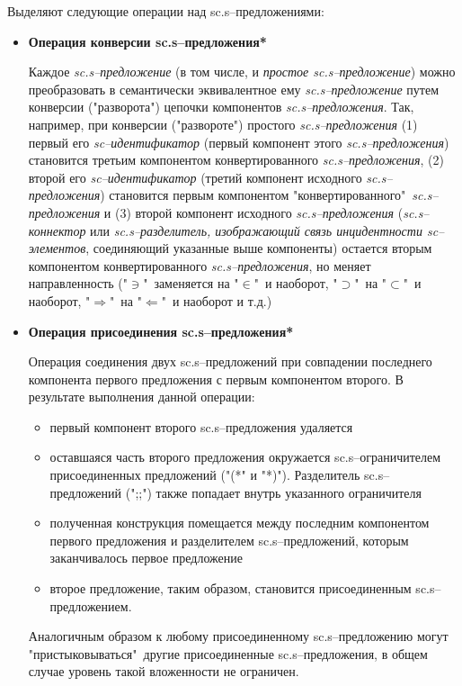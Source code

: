 Выделяют следующие операции над sc.s--предложениями:
\begin{itemize}
	\item{\textbf{Операция конверсии sc.s--предложения*}
		
		Каждое \textit{sc.s--предложение} (в том числе, и \textit{простое sc.s--предложение}) можно преобразовать в семантически эквивалентное ему \textit{sc.s--предложение} путем конверсии ("разворота"{}) цепочки компонентов \textit{sc.s--предложения}. Так, например, при конверсии ("развороте") простого \textit{\mbox{sc.s--предложения}} (1) первый его \textit{\mbox{sc--идентификатор}} (первый компонент этого \textit{\mbox{sc.s--предложения}}) становится третьим компонентом конвертированного\textit{ \mbox{sc.s--предложения}}, (2) второй его \textit{\mbox{sc--идентификатор}} (третий компонент исходного \textit{\mbox{sc.s--предложения}}) становится первым компонентом "конвертированного"\ \textit{\mbox{sc.s--предложения}} и (3) второй компонент исходного \textit{\mbox{sc.s--предложения}} (\textit{\mbox{sc.s--коннектор}} или \textit{\mbox{sc.s--разделитель}, изображающий связь инцидентности \mbox{sc--элементов}}, соединяющий указанные выше компоненты) остается вторым компонентом конвертированного \textit{\mbox{sc.s--предложения}}, но меняет направленность ("$\ni$"\ заменяется на "$\in$"\ и наоборот, "$\supset$"\ на "$\subset$"\ и наоборот, "$\Rightarrow$"\ на "$\Leftarrow$"\ и наоборот и т.д.)}
	\item{\textbf{Операция присоединения sc.s--предложения*}
		
		Операция соединения двух sc.s--предложений при совпадении последнего компонента первого предложения с первым компонентом второго.
		В результате выполнения данной операции:
		\begin{itemize}
			\item первый компонент второго sc.s--предложения удаляется
			\item оставшаяся часть второго предложения окружается sc.s--ограничителем присоединенных предложений ("(*"{} и "*)"{}). Разделитель sc.s--предложений (";;"{}) также попадает внутрь указанного ограничителя
			\item полученная конструкция помещается между последним компонентом первого предложения и разделителем sc.s--предложений, которым заканчивалось первое предложение
			\item второе предложение, таким образом, становится присоединенным sc.s--предложением.
		\end{itemize}
		Аналогичным образом к любому присоединенному sc.s--предложению могут "пристыковываться"\ другие присоединенные sc.s--предложения, в общем случае уровень такой вложенности не ограничен.
		
}
\end{itemize}
